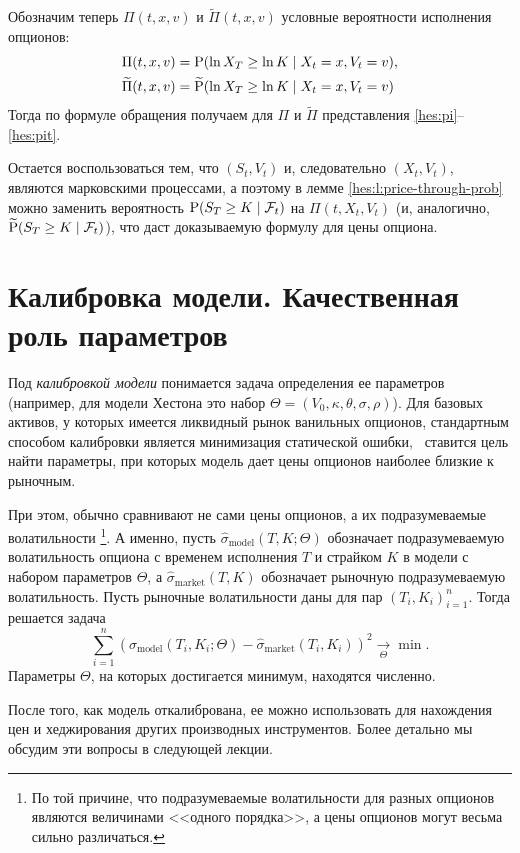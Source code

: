 Обозначим теперь $\Pi(t,x,v)$ и $\tilde\Pi(t,x,v)$ условные вероятности исполнения опционов:
\begin{align*}
&\Pi(t,x,v) = \P(\ln X_T \ge \ln K \mid X_t =x , V_t=v), \\
&\tilde \Pi(t,x,v) = \tilde \P(\ln X_T \ge \ln K \mid X_t =x , V_t=v)
\end{align*}
Тогда по формуле обращения получаем для $\Pi$ и $\tilde\Pi$ представления \eqref{hes:pi}--\eqref{hes:pit}.

Остается воспользоваться тем, что $(S_t,V_t)$ и, следовательно $(X_t,V_t)$, являются марковскими процессами, а поэтому в лемме \eqref{hes:l:price-through-prob} можно заменить вероятность $\P(S_T\ge K\mid \F_t)$ на $\Pi(t, X_t, V_t)$ (и, аналогично, $\tilde \P(S_T\ge K\mid \F_t)$), что даст доказываемую формулу для цены опциона.


\section{Калибровка модели. Качественная роль параметров}

Под \emph{калибровкой модели} понимается задача определения ее параметров (например, для модели Хестона это набор $\Theta=(V_0,\kappa,\theta,\sigma,\rho)$).
Для базовых активов, у которых имеется ликвидный рынок ванильных опционов, стандартным способом калибровки является минимизация статической ошибки, \te\ ставится цель найти параметры, при которых модель дает цены опционов наиболее близкие к рыночным.

При этом, обычно сравнивают не сами цены опционов, а их подразумеваемые волатильности%
\footnote{По той причине, что подразумеваемые волатильности для разных опционов являются величинами <<одного порядка>>, а цены опционов могут весьма сильно различаться.}.
А именно, пусть $\hat\sigma_\text{model}(T,K; \Theta)$ обозначает подразумеваемую волатильность опциона с временем исполнения $T$ и страйком $K$ в модели с набором параметров $\Theta$, а $\hat\sigma_\text{market}(T,K)$ обозначает рыночную подразумеваемую волатильность.
Пусть рыночные волатильности даны для пар $(T_i,K_i)_{i=1}^n$.
Тогда решается задача 
\begin{equation}
\label{hes:calibration}
\sum_{i=1}^n (\hat\sigma_\text{model}(T_i,K_i;\Theta) - \hat\sigma_\text{market}(T_i,K_i))^2 \xrightarrow[\Theta]{} \min.
\end{equation}
Параметры $\Theta$, на которых достигается минимум, находятся численно. 

После того, как модель откалибрована, ее можно использовать для нахождения цен и хеджирования других производных инструментов.
Более детально мы обсудим эти вопросы в следующей лекции.

